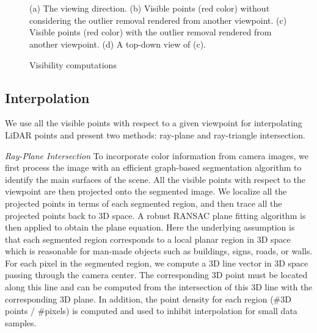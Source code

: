 \begin{figure}[H]
\centering
{} 
\hspace{.1in}
 \\
\hspace{.1in}
 \\

\caption{Visibility computations} {(a) The viewing direction. (b) Visible points (red color) without considering the outlier removal rendered from another viewpoint. (c) Visible points (red color) with the outlier removal rendered from another viewpoint. (d) A top-down view of (c). }

\label{fig:C6:VisibilityC} 
\end{figure}

\subsection{Interpolation}

We use all the visible points with respect to a given viewpoint for interpolating LiDAR points and present two methods: ray-plane and ray-triangle intersection. 

{\it Ray-Plane Intersection} To incorporate color information from camera images, we first process the image with an efficient graph-based segmentation algorithm \cite{Felzenszwalb04} to identify the main surfaces of the scene. All the visible points with respect to the viewpoint are then projected onto the segmented image. We localize all the projected points in terms of each segmented region, and then trace all the projected points back to 3D space. A robust RANSAC plane fitting algorithm \cite{Fischler87} is then applied to obtain the plane equation. Here the underlying assumption is that each segmented region corresponds to a local planar region in 3D space which is reasonable for man-made objects such as buildings, signs, roads, or walls. For each pixel in the segmented region, we compute a 3D line vector in 3D space passing through the camera center. The corresponding 3D point must be located along this line and can be computed from the intersection of this 3D line with the corresponding 3D plane. In addition, the point density for each region (\#3D points / \#pixels) is computed and used to inhibit interpolation for small data samples.  

